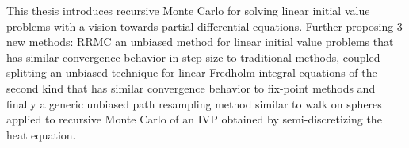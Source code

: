This thesis introduces recursive Monte Carlo
for solving linear initial value problems with a vision towards
partial differential equations.
Further proposing $3$ new methods:
RRMC an unbiased method for linear initial value problems
that has similar convergence behavior in step size to traditional methods,
coupled splitting an unbiased technique for linear Fredholm integral equations of the
second kind that has similar convergence behavior to fix-point methods
and finally a generic unbiased path resampling method similar to walk on spheres applied
to recursive Monte Carlo of an IVP obtained by semi-discretizing the heat equation.